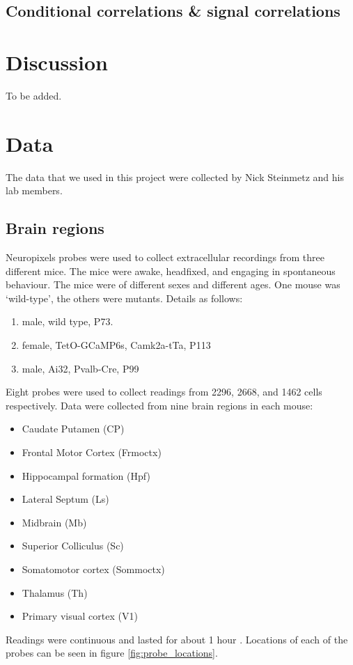 \documentclass[a4paper,12pt]{article}
\theoremstyle{definition}
\begin{document}
  \subsection{Conditional correlations \& signal correlations}

\section{Discussion}
To be added.

\section{Data}

    The data that we used in this project were collected by Nick Steinmetz and his lab members\cite{stringer}.

    \subsection{Brain regions}
    Neuropixels probes were used to collect extracellular recordings \cite{jun} from three different mice. The mice were awake, headfixed, and engaging in spontaneous behaviour. The mice were of different sexes and different ages. One mouse was `wild-type', the others were mutants. Details as follows:
    \begin{enumerate}
        \item male, wild type, P73. %
        \item female, TetO-GCaMP6s, Camk2a-tTa, P113 %
        \item male, Ai32, Pvalb-Cre, P99 %
    \end{enumerate}

    Eight probes were used to collect readings from 2296, 2668, and 1462 cells respectively. Data were collected from nine brain regions in each mouse:
    \begin{itemize}
        \item Caudate Putamen (CP)
        \item Frontal Motor Cortex (Frmoctx)
        \item Hippocampal formation (Hpf)
        \item Lateral Septum (Ls)
        \item Midbrain (Mb)
        \item Superior Colliculus (Sc)
        \item Somatomotor cortex (Sommoctx)
        \item Thalamus (Th)
        \item Primary visual cortex (V1)
    \end{itemize}
    Readings were continuous and lasted for about 1 hour \cite{stringer}. Locations of each of the probes can be seen in figure \ref{fig:probe_locations}.
\end{document}
